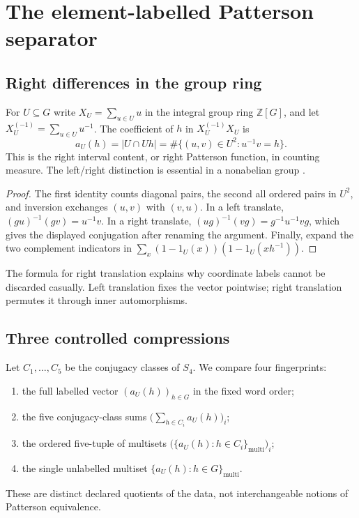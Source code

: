 \section{The element-labelled Patterson separator}
\label{sec:patterson}

\subsection{Right differences in the group ring}

For $U\subseteq G$ write $X_U=\sum_{u\in U}u$ in the integral group ring
$\mathbb Z[G]$, and let $X_U^{(-1)}=\sum_{u\in U}u^{-1}$.  The coefficient of
$h$ in $X_U^{(-1)}X_U$ is
\[
 a_U(h)=|U\cap Uh|=\#\{(u,v)\in U^2:u^{-1}v=h\}.
\]
This is the right interval content, or right Patterson function, in counting
measure.  The left/right distinction is essential in a nonabelian group
\cite{MandereauEtAl2011,GenuysPopoff2018}.

\begin{proof}
The first identity counts diagonal pairs, the second all ordered pairs in
$U^2$, and inversion exchanges $(u,v)$ with $(v,u)$.  In a left translate,
$(gu)^{-1}(gv)=u^{-1}v$.  In a right translate,
$(ug)^{-1}(vg)=g^{-1}u^{-1}vg$, which gives the displayed conjugation after
renaming the argument.  Finally, expand the two complement indicators in
$\sum_x(1-1_U(x))(1-1_U(xh^{-1}))$.
\end{proof}

The formula for right translation explains why coordinate labels cannot be
discarded casually.  Left translation fixes the vector pointwise; right
translation permutes it through inner automorphisms.

\subsection{Three controlled compressions}

Let $C_1,\ldots,C_5$ be the conjugacy classes of $S_4$.  We compare four
fingerprints:
\begin{enumerate}[label=(\roman*),leftmargin=2.2em]
\item the full labelled vector $(a_U(h))_{h\in G}$ in the fixed word order;
\item the five conjugacy-class sums
$\bigl(\sum_{h\in C_i}a_U(h)\bigr)_i$;
\item the ordered five-tuple of multisets
$\bigl(\{a_U(h):h\in C_i\}_{\mathrm{multi}}\bigr)_i$;
\item the single unlabelled multiset
$\{a_U(h):h\in G\}_{\mathrm{multi}}$.
\end{enumerate}
These are distinct declared quotients of the data, not interchangeable
notions of Patterson equivalence.

